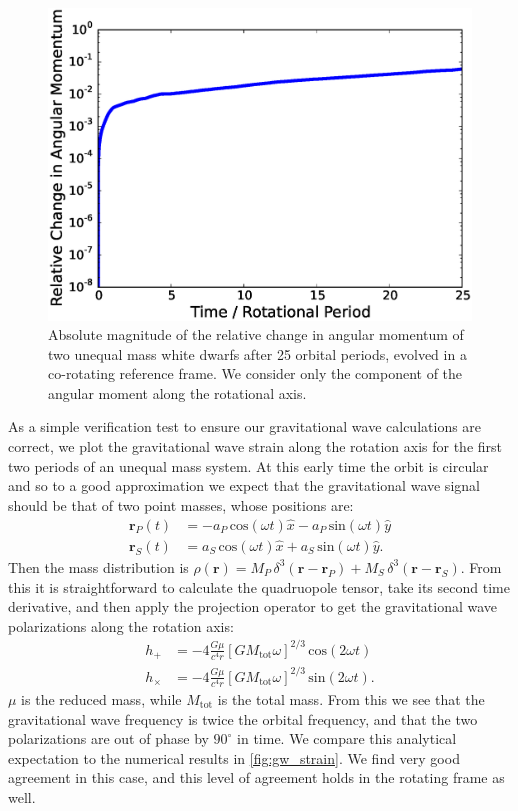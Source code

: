 \documentclass[iop,numberedappendix]{../emulateapj}
\begin{document}
\begin{figure}
  \centering
  \includegraphics[scale=0.45]{plots/unequal_angular_momentum_rot1.eps}
  \caption{Absolute magnitude of the relative change in angular momentum of two unequal mass white dwarfs after 25 orbital periods, 
           evolved in a co-rotating reference frame. We consider only the component of the angular moment along the rotational 
           axis.
           \label{fig:angular_momentum_conservation_unequal}}
\end{figure}

As a simple verification test to ensure our gravitational wave calculations are correct, we plot the 
gravitational wave strain along the rotation axis for the first two periods of an unequal mass system. 
At this early time the orbit is circular and so to a good approximation we expect that the gravitational 
wave signal should be that of two point masses, whose positions are:
\begin{align}
  \mathbf{r}_P(t) &= -a_P\, \text{cos}(\omega t) \hat{x} - a_P\, \text{sin}(\omega t) \hat{y} \\
  \mathbf{r}_S(t) &= a_S\, \text{cos}(\omega t) \hat{x} + a_S\, \text{sin}(\omega t) \hat{y}.
\end{align}
Then the mass distribution is $\rho(\mathbf{r}) = M_P\, \delta^3(\mathbf{r} - \mathbf{r}_P) + M_S\, \delta^3(\mathbf{r} - \mathbf{r}_S)$.
From this it is straightforward to calculate the quadruopole tensor, take its second time derivative, and then apply the 
projection operator to get the gravitational wave polarizations along the rotation axis:
\begin{align}
  h_+ &= -4\frac{G\mu}{c^4 r}\left[G M_{\text{tot}} \omega \right]^{2/3}\, \text{cos}(2\omega t) \\
  h_\times &= -4\frac{G\mu}{c^4 r}\left[G M_{\text{tot}} \omega \right]^{2/3}\, \text{sin}(2\omega t).
\end{align}
$\mu$ is the reduced mass, while $M_{\text{tot}}$ is the total mass. From this we see that the 
gravitational wave frequency is twice the orbital frequency, and that the two polarizations 
are out of phase by $90^\circ$ in time. We compare this analytical expectation to the 
numerical results in \autoref{fig:gw_strain}. We find very good agreement in this case, and this 
level of agreement holds in the rotating frame as well.
\end{document}
